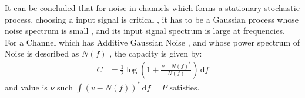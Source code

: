 It can be concluded that for noise in channels which forms a stationary stochastic process, choosing a input signal is critical , it has to be a Gaussian process whose noise spectrum is small , and its input signal spectrum is large at frequencies. 
\\
For a Channel which has Additive Gaussian Noise , and whose power spectrum of Noise is described as $N(f)$ , the capacity is given by:
\begin{align}
C &= \frac{1}{2} \log \left( 1 + \frac{\nu - N(f)^*}{N(f)} \right) \,\mathrm{d}f
\end{align}
and value is $\nu$  such  $\int (v - N(f))^* \,\mathrm{d}f = P$ satisfies.